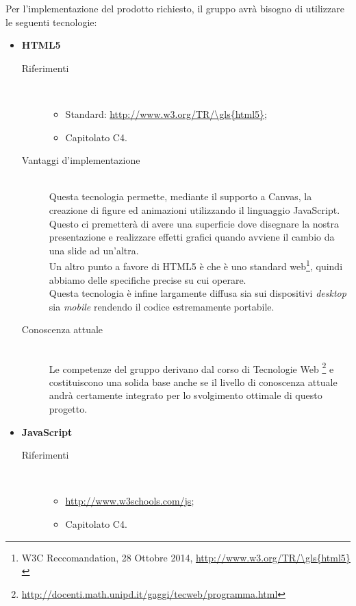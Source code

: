 Per l'implementazione del prodotto richiesto, il gruppo avrà bisogno di utilizzare le seguenti tecnologie:
\begin{itemize}
	\item \textbf{\gls{HTML5}}
	\begin{description}
		\item[Riferimenti]\ 
		\noindent\begin{itemize}
			\item Standard: \url{http://www.w3.org/TR/\gls{html5}};
			\item Capitolato C4.
		\end{itemize}
		
		\item[Vantaggi d'implementazione]\ \\
		\noindent Questa tecnologia permette, mediante il supporto a Canvas, la creazione di figure ed animazioni  utilizzando il linguaggio \gls{JavaScript}. Questo ci premetterà di avere una superficie dove disegnare la nostra presentazione e realizzare effetti grafici quando avviene il cambio da una slide ad un'altra. \\ Un altro punto a favore di \gls{HTML5} è che è uno standard web\footnote{W3C Reccomandation, 28 Ottobre 2014, \url{http://www.w3.org/TR/\gls{html5}}}, quindi abbiamo delle specifiche precise su cui operare. \\ Questa tecnologia è infine largamente diffusa sia sui dispositivi \textit{desktop} sia \textit{mobile} rendendo il codice estremamente portabile.

		\item[Conoscenza attuale]\ \\
		\noindent Le competenze del gruppo \GRUPPO{}  derivano dal corso di Tecnologie Web \footnote{\url{http://docenti.math.unipd.it/gaggi/tecweb/programma.html}} e costituiscono una solida base anche se il livello di conoscenza attuale andrà certamente integrato per lo svolgimento ottimale di questo progetto.
	\end{description}

	\item \textbf{\gls{JavaScript}}
	\begin{description}
		\item[Riferimenti]\ 
		\noindent\begin{itemize}
			\item \url{http://www.w3schools.com/js};
			\item Capitolato C4.
		\end{itemize}
		

\end{description}
\end{itemize}
